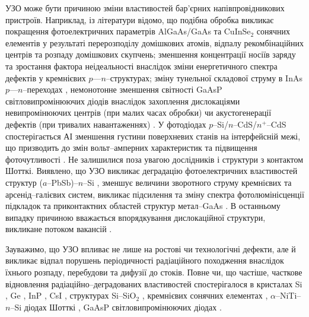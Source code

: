 УЗО може бути причиною зміни властивостей бар'єрних напівпровідникових пристроїв.
Наприклад, із літератури відомо, що подібна обробка викликає покращення фотоелектричних параметрів AlGaAs/GaAs \cite{Zaver2005} та CuInSe$_2$ \cite{OstapSC} сонячних елементів у результаті перерозподілу домішкових атомів, відпалу рекомбінаційних центрів та розпаду домішкових скупчень;
зменшення концентрації носіїв заряду \cite{Davletova2008}
та зростання фактора неідеальності \cite{Davletova2009}
внаслідок зміни енергетичного спектра дефектів у кремнієвих $p$---$n$--структурах;
зміну тунельної складової струму в InAs $p$---$n$--переходах \cite{Teterkin2009r},
немонотонне зменшення світності GaAsP світловипромінюючих діодів внаслідок захоплення дислокаціями невипромінюючих центрів (при малих часах обробки) чи акустогенерації дефектів (при тривалих навантаженнях) \cite{US:LED}.
У фотодіодах $p$--Si/$n$--CdS/$n^+$--CdS спостерігається АІ зменшення густини поверхневих станів на інтерфейсній межі,
що призводить до змін вольт--амперних характеристик та підвищення фоточутливості \cite{Mirsagatov,Mirsagatov2}.
Не залишилися поза увагою дослідників і структури з контактом Шотткі.
Виявлено, що УЗО викликає деградацію фотоелектричних властивостей структур ($a$--PbSb)--$n$--Si \cite{Pashaev2012r,PashOJA},
зменшує величини зворотного струму кремнієвих \cite{Tagaev} та арсенід--галієвих \cite{UST:SDErmol} систем,
викликає підсилення та зміну спектра фотолюмінісценції підкладок та приконтактних областей структур метал--GaAs \cite{UST:SDErmol}.
В останньому випадку причиною вважається впорядкування дислокаційної структури, викликане потоком вакансій \cite{UST:SDErmol}.

Зауважимо, що УЗО впливає не лише на ростові чи технологічні дефекти, але й викликає відпал порушень періодичності радіаційного походження внаслідок їхнього розпаду, перебудови та дифузії до стоків.
Повне чи, що частіше, часткове відновлення радіаційно--деградованих властивостей спостерігалося
в кристалах Si  \cite{OstrovRadSi,Podolian2012r,PodolHivr,YOlikh2006TPLr}, Ge \cite{Olikh:FTP1996},
InP \cite{OlikhProc}, CsI \cite{UST:OstrovCsI}, структурах Si--SiO$_2$ \cite{Parchinskii2000r,Parchinskii2006r},
кремнієвих сонячних елементах \cite{YOlikh2007TPLr},
$\alpha$--NiTi--$n$--Si діодах Шотткі \cite{Pashaev2014r},
GaAsP світловипромінюючих діодах \cite{US:LED,UST:LED_SM}.



